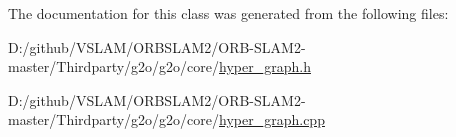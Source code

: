 The documentation for this class was generated from the following files\+:\begin{DoxyCompactItemize}
\item 
D\+:/github/\+V\+S\+L\+A\+M/\+O\+R\+B\+S\+L\+A\+M2/\+O\+R\+B-\/\+S\+L\+A\+M2-\/master/\+Thirdparty/g2o/g2o/core/\mbox{\hyperlink{hyper__graph_8h}{hyper\+\_\+graph.\+h}}\item 
D\+:/github/\+V\+S\+L\+A\+M/\+O\+R\+B\+S\+L\+A\+M2/\+O\+R\+B-\/\+S\+L\+A\+M2-\/master/\+Thirdparty/g2o/g2o/core/\mbox{\hyperlink{hyper__graph_8cpp}{hyper\+\_\+graph.\+cpp}}\end{DoxyCompactItemize}
